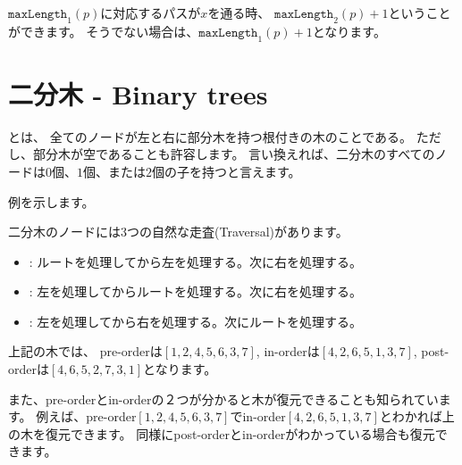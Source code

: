 $\texttt{maxLength}_1(p)$に対応するパスが$x$を通る時、
$\texttt{maxLength}_2(p)+1$ということができます。
そうでない場合は、$\texttt{maxLength}_1(p)+1$となります。

\section{二分木 - Binary trees}


\begin{samepage}

とは、
全てのノードが左と右に部分木を持つ根付きの木のことである。
ただし、部分木が空であることも許容します。
言い換えれば、二分木のすべてのノードは$0$個、$1$個、または$2$個の子を持つと言えます。

例を示します。
\begin{center}
\end{center}
\end{samepage}

二分木のノードには3つの自然な走査(Traversal)があります。
\begin{itemize}
\item {}: ルートを処理してから左を処理する。次に右を処理する。
\item {}: 左を処理してからルートを処理する。次に右を処理する。
\item {}: 左を処理してから右を処理する。次にルートを処理する。
\end{itemize}

上記の木では、
pre-orderは$[1,2,4,5,6,3,7]$,
in-orderは$[4,2,6,5,1,3,7]$,
post-orderは$[4,6,5,2,7,3,1]$となります。

また、pre-orderとin-orderの２つが分かると木が復元できることも知られています。
例えば、pre-order$[1,2,4,5,6,3,7]$でin-order$[4,2,6,5,1,3,7]$とわかれば上の木を復元できます。
同様にpost-orderとin-orderがわかっている場合も復元できます。

